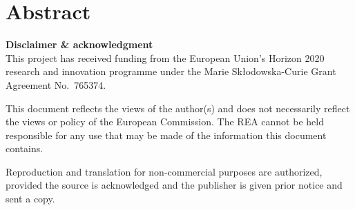 \documentclass{ROMSOC}
\begin{document}
\section*{Abstract}



\vfill

{\small
\textbf{Disclaimer \& acknowledgment}\\
This project has received funding from the European Union’s Horizon 2020 research and innovation programme under the Marie Sk\l odowska-Curie Grant Agreement No.~765374. 

This document reflects the views of the author(s) and does not necessarily reflect the views or policy of the European Commission. The REA cannot be held responsible for any use that may be made of the information this document contains.

Reproduction and translation for non-commercial purposes are authorized, provided the source is acknowledged and the publisher is given prior notice and sent a copy. 
}
\clearpage

\setcounter{tocdepth}{1}

\vfill

\tableofcontents
\vfill
\end{document}
